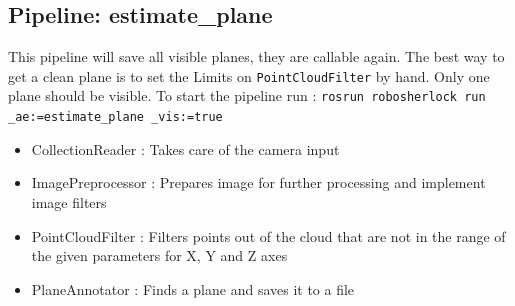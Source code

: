 \documentclass[main.tex]{subfiles}
\begin{document}
			\subsection{Pipeline: estimate\_plane}
This pipeline will save all visible planes, they are callable again. The best way to get a clean plane is to set the Limits on \texttt{PointCloudFilter} by hand. Only one plane should be visible. To start the pipeline run : \texttt{rosrun robosherlock run \_ae:=estimate\_plane \_vis:=true} 
\begin{itemize}
	\item CollectionReader : Takes care of the camera input
	\item ImagePreprocessor : Prepares image for further processing and implement image filters  
	\item PointCloudFilter : Filters points out of the cloud that are not in the range of the given parameters for X, Y and Z axes
	\item PlaneAnnotator : Finds a plane and saves it to a file 
\end{itemize}
\end{document}
